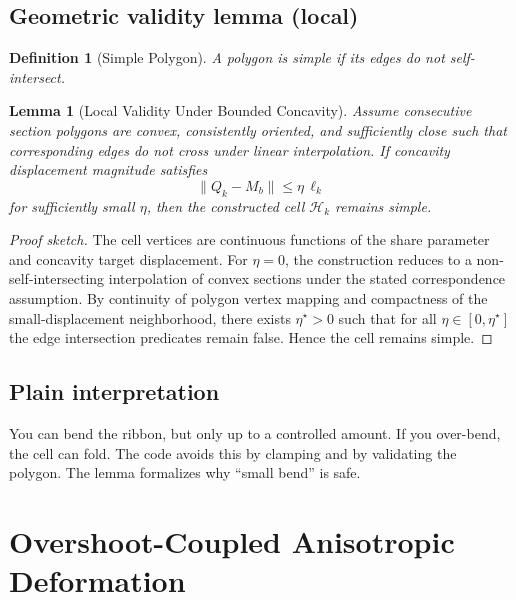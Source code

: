 \documentclass[journal]{IEEEtran}
\newtheorem{definition}{Definition}
\newtheorem{lemma}{Lemma}
\begin{document}
\subsection{Geometric validity lemma (local)}

\begin{definition}[Simple Polygon]
A polygon is \emph{simple} if its edges do not self-intersect.
\end{definition}

\begin{lemma}[Local Validity Under Bounded Concavity]
Assume consecutive section polygons are convex, consistently oriented, and sufficiently close such that corresponding edges do not cross under linear interpolation. If concavity displacement magnitude satisfies
\begin{equation}
\|Q_k - M_b\| \le \eta \,\ell_k
\end{equation}
for sufficiently small \(\eta\), then the constructed cell \(\mathcal{H}_k\) remains simple.
\end{lemma}

\begin{proof}[Proof sketch]
The cell vertices are continuous functions of the share parameter and concavity target displacement. For \(\eta=0\), the construction reduces to a non-self-intersecting interpolation of convex sections under the stated correspondence assumption. By continuity of polygon vertex mapping and compactness of the small-displacement neighborhood, there exists \(\eta^\star>0\) such that for all \(\eta\in[0,\eta^\star]\) the edge intersection predicates remain false. Hence the cell remains simple.
\end{proof}

\subsection{Plain interpretation}
You can bend the ribbon, but only up to a controlled amount. If you over-bend, the cell can fold. The code avoids this by clamping and by validating the polygon. The lemma formalizes why ``small bend'' is safe.

\section{Overshoot-Coupled Anisotropic Deformation}
\end{document}
